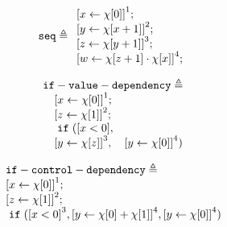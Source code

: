 \begin{example}
    \[
        \kw{seq} \triangleq 
    \begin{array}{l} 
           \clabel{ \assign{x}{\chi[0]}}^{1} ; \\
            \clabel{\assign{y}{\chi[x + 1]} }^{2} ; \\
            \clabel{\assign{z}{\chi[y + 1]}}^{3}; \\
             \clabel{\assign{w}{\chi[z + 1] \cdot \chi[x]} }^{4}  ; \\
        \end{array}
    \]
    \end{example}

    \begin{example}
        \[
        \begin{array}{l}
        \kw{if-value-dependency} \triangleq \\
           \quad \clabel{ \assign{x}{\chi[0]}}^{1} ; \\
           \quad \clabel{\assign{z}{\chi[1]} }^{2} ; \\
           \quad \eif(\clabel{x < 0}, \\
           \quad \clabel{\assign{y}{\chi[z]}}^{3}, 
           \quad \clabel{\assign{y}{\chi[0]}}^{4})
            \end{array}
        \]
        \end{example}

        \begin{example}
            \[
            \begin{array}{l}
            \kw{if-control-dependency} \triangleq \\
                \clabel{ \assign{x}{\chi[0]}}^{1} ; \\
                \clabel{\assign{z}{\chi[1]} }^{2} ; \\
                \eif(\clabel{x < 0}^{3}, 
                \clabel{\assign{y}{\chi[0] + \chi[1]}}^{4}, 
                \clabel{\assign{y}{\chi[0]}}^{4})
            \end{array}
            \]
            \end{example}


